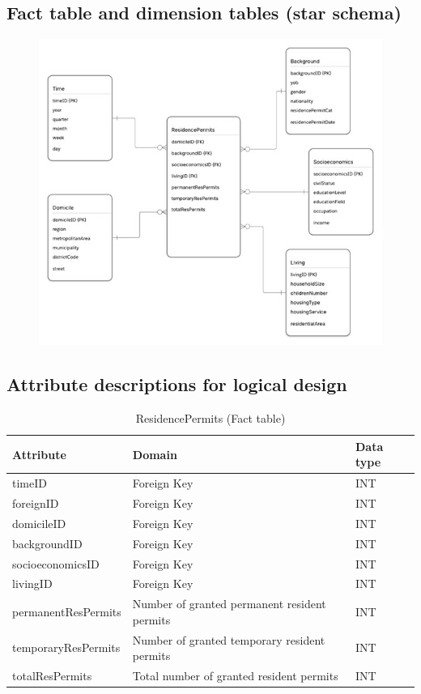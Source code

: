 \subsection{Fact table and dimension tables (star schema)}
\begin{figure}[h] %
  \centering
  \includegraphics[width=1.0\textwidth]{Figures/Q4_StarSchema.jpg}
  \label{fig:my_image}
\end{figure}
\newpage
\subsection{Attribute descriptions for logical design}
\begin{table}[htbp]
  \centering
  \caption{ResidencePermits (Fact table)}
  \begin{tabular}{|l|l|l|}
    \hline
    \textbf{Attribute} & \textbf{Domain} & \textbf{Data type} \\
    \hline
    timeID & Foreign Key & INT \\
    \hline
    foreignID & Foreign Key & INT \\
    \hline
    domicileID & Foreign Key & INT \\
    \hline
    backgroundID & Foreign Key & INT \\
    \hline
    socioeconomicsID & Foreign Key & INT \\
    \hline
    livingID & Foreign Key & INT \\
    \hline
    permanentResPermits & Number of granted permanent resident permits & INT \\
    \hline
    temporaryResPermits & Number of granted temporary resident permits & INT \\
    \hline
    totalResPermits & Total number of granted resident permits & INT \\
    \hline
  \end{tabular}
\end{table}


